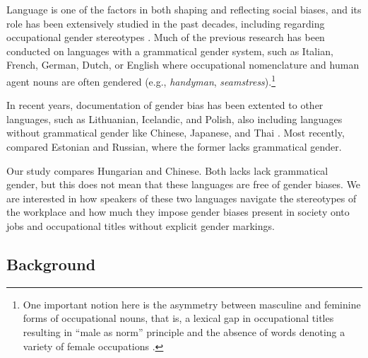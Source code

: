 \documentclass[11pt]{article}
\begin{document}
Language is one of the factors in both shaping and reflecting social biases, and its role has been extensively studied in the past decades, including regarding occupational gender stereotypes \citep[cf.][]{sabatini_1985_occupational,pauwels_1997_handymen,gygax_2008_generically,misersky_2014_norms,lewis_2020_gender,kaukonen_2025_gender}. Much of the previous research has been conducted on languages with a grammatical gender system, such as Italian, French, German, Dutch, or English where occupational nomenclature and human agent nouns are often gendered (e.g., \textit{handyman}, \textit{seamstress}).\footnote{One important notion here is the asymmetry between masculine and feminine forms of occupational nouns, that is, a lexical gap in occupational titles resulting in ``male as norm'' principle and the absence of words denoting a variety of female occupations \citep{baron_1986_grammar,hellinger_1990_kontrastive,sabatini_1985_occupational,yaguello_1978_mots,pauwels_2003_linguistic,lassonde_2013_occupational}.} 



In recent years, documentation of gender bias has been extented to other languages, such as Lithuanian, Icelandic, and Polish, also including languages without grammatical gender like Chinese, Japanese, and Thai \citep[][]{hellinger_2003_gender,pauwels_2003_linguistic}. Most recently, \citet{kaukonen_2025_gender} compared Estonian and Russian, where the former lacks grammatical gender.

Our study compares Hungarian and Chinese. Both lacks lack grammatical gender, but this does not mean that these languages are free of gender biases. We are interested in how speakers of these two languages navigate the stereotypes of the workplace and how much they impose gender biases present in society onto jobs and occupational titles without explicit gender markings.

\subsection{Background}
\end{document}
